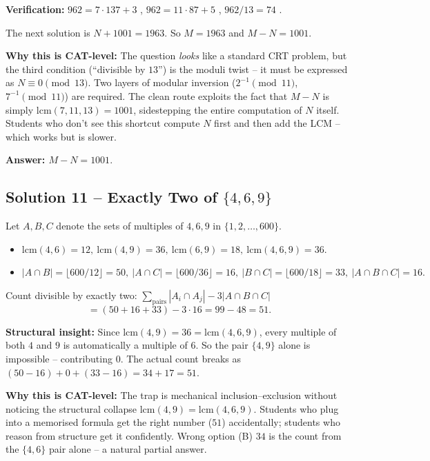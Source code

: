 \documentclass[11pt,a4paper]{article}
\begin{document}
\textbf{Verification:} $962 = 7\cdot 137 + 3$ \checkmark, $962 = 11\cdot 87 + 5$ \checkmark, $962/13 = 74$ \checkmark.

The next solution is $N + 1001 = 1963$. So $M = 1963$ and $M-N = 1001.$

\textbf{Why this is CAT-level:} The question \emph{looks} like a standard CRT problem, but the third condition (``divisible by $13$'') is the moduli twist -- it must be expressed as $N\equiv 0\pmod{13}$. Two layers of modular inversion ($2^{-1}\pmod{11}$, $7^{-1}\pmod{11}$) are required. The clean route exploits the fact that $M-N$ is simply $\mathrm{lcm}(7,11,13)=1001$, sidestepping the entire computation of $N$ itself. Students who don't see this shortcut compute $N$ first and then add the LCM -- which works but is slower.

\textbf{Answer: $M - N = 1001.$}

\medskip

\subsection*{Solution 11 -- Exactly Two of $\{4,6,9\}$}
Let $A, B, C$ denote the sets of multiples of $4, 6, 9$ in $\{1,2,\ldots,600\}$.
\begin{itemize}[leftmargin=*,itemsep=0pt]
  \item $\mathrm{lcm}(4,6)=12,\ \mathrm{lcm}(4,9)=36,\ \mathrm{lcm}(6,9)=18,\ \mathrm{lcm}(4,6,9)=36.$
  \item $|A\cap B|=\lfloor 600/12\rfloor=50,\ |A\cap C|=\lfloor 600/36\rfloor=16,\ |B\cap C|=\lfloor 600/18\rfloor=33,\ |A\cap B\cap C|=16.$
\end{itemize}

Count divisible by exactly two: $\sum_{\text{pairs}}|A_i\cap A_j| - 3|A\cap B\cap C|$
\[
=(50+16+33)-3\cdot 16 = 99 - 48 = 51.
\]

\textbf{Structural insight:} Since $\mathrm{lcm}(4,9)=36=\mathrm{lcm}(4,6,9)$, every multiple of both $4$ and $9$ is automatically a multiple of $6$. So the pair $\{4,9\}$ alone is impossible -- contributing $0$. The actual count breaks as $(50-16) + 0 + (33-16) = 34 + 17 = 51.$

\textbf{Why this is CAT-level:} The trap is mechanical inclusion--exclusion without noticing the structural collapse $\mathrm{lcm}(4,9)=\mathrm{lcm}(4,6,9)$. Students who plug into a memorised formula get the right number ($51$) accidentally; students who reason from structure get it confidently. Wrong option (B) $34$ is the count from the $\{4,6\}$ pair alone -- a natural partial answer.
\end{document}
